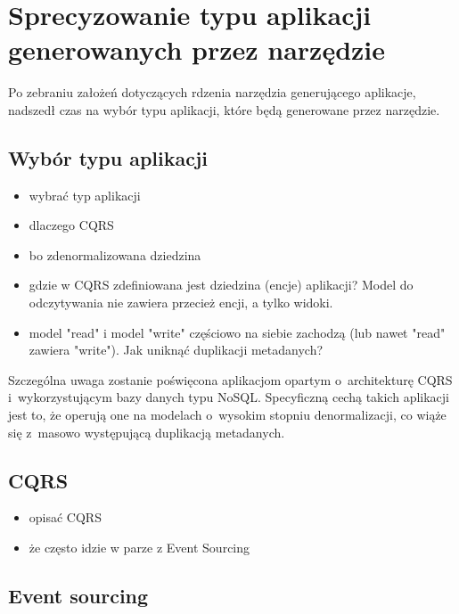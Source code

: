 \chapter{Sprecyzowanie typu aplikacji generowanych przez narzędzie} \label{chap:generated_app_type}

Po zebraniu założeń dotyczących rdzenia narzędzia generującego aplikacje, nadszedł czas na wybór typu aplikacji, które będą generowane przez narzędzie.

\section{Wybór typu aplikacji}

\begin{itemize}
 \item wybrać typ aplikacji
 \item dlaczego CQRS
  \item bo zdenormalizowana dziedzina
  \item gdzie w CQRS zdefiniowana jest dziedzina (encje) aplikacji? Model do odczytywania nie zawiera przecież encji, a tylko widoki.
  \item model "read" i model "write" częściowo na siebie zachodzą (lub nawet "read" zawiera "write"). Jak uniknąć duplikacji metadanych?
\end{itemize}

Szczególna uwaga zostanie poświęcona aplikacjom opartym o~architekturę CQRS i~wykorzystującym bazy danych typu NoSQL.
Specyficzną cechą takich aplikacji jest to, że operują one na modelach o~wysokim stopniu denormalizacji, co wiąże się z~masowo występującą duplikacją metadanych.



\section{CQRS}

\begin{itemize}
 \item opisać CQRS
 \item że często idzie w parze z Event Sourcing
\end{itemize}



\section{Event sourcing}

